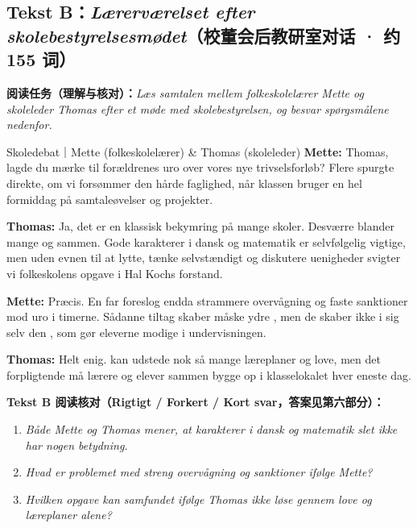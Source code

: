 \subsection*{Tekst B：\textit{Lærerværelset efter skolebestyrelsesmødet}（校董会后教研室对话 · 约 155 词）}

\textbf{阅读任务（理解与核对）：}\textit{Læs samtalen mellem folkeskolelærer Mette og skoleleder Thomas efter et møde med skolebestyrelsen, og besvar spørgsmålene nedenfor.}

\begin{emailbox}{Skoledebat｜Mette (folkeskolelærer) \& Thomas (skoleleder)}
\textbf{Mette:} Thomas, lagde du mærke til forældrenes uro over vores nye trivselsforløb? Flere spurgte direkte, om vi forsømmer den hårde faglighed, når klassen bruger en hel formiddag på samtaleøvelser og projekter.

\textbf{Thomas:} Ja, det er en klassisk bekymring på mange skoler. Desværre blander mange  og  sammen. Gode karakterer i dansk og matematik er selvfølgelig vigtige, men uden evnen til at lytte, tænke selvstændigt og diskutere uenigheder svigter vi folkeskolens opgave i Hal Kochs forstand.

\textbf{Mette:} Præcis. En far foreslog endda strammere overvågning og faste sanktioner mod uro i timerne. Sådanne tiltag skaber måske ydre , men de skaber ikke i sig selv den , som gør eleverne modige i undervisningen.

\textbf{Thomas:} Helt enig.  kan udstede nok så mange læreplaner og love, men det forpligtende  må lærere og elever sammen bygge op i klasselokalet hver eneste dag.
\end{emailbox}

\textbf{Tekst B 阅读核对（Rigtigt / Forkert / Kort svar，答案见第六部分）：}
\begin{enumerate}
  \item \textit{Både Mette og Thomas mener, at karakterer i dansk og matematik slet ikke har nogen betydning.} \underline{\hspace{2.2cm}}
  \item \textit{Hvad er problemet med streng overvågning og sanktioner ifølge Mette?} \underline{\hspace{2.2cm}}
  \item \textit{Hvilken opgave kan samfundet ifølge Thomas ikke løse gennem love og læreplaner alene?} \underline{\hspace{2.2cm}}
\end{enumerate}

